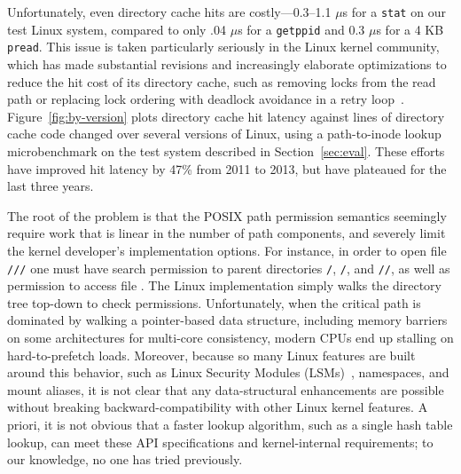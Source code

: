 Unfortunately, even directory cache hits are costly---0.3--1.1 $\mu$s for a {\tt stat} on our test Linux system, compared to only .04 $\mu$s for a {\tt getppid} and 0.3 $\mu$s for a 4 KB {\tt pread}. 
This issue is taken particularly seriously in the Linux kernel community, which has 
made substantial revisions and increasingly elaborate optimizations to reduce the hit cost
of its directory cache, such as removing locks from the read path or replacing lock ordering with deadlock avoidance in a retry loop~\cite{corbet09jls,dcache-rcu}.
Figure~\ref{fig:by-version} plots directory cache hit latency against  lines of directory cache code changed 
over several versions of Linux, using a path-to-inode lookup microbenchmark on the test system described
in Section~\ref{sec:eval}.
These efforts have improved hit latency by 47\% from 2011 to 2013, but have plateaued
for the last three years.

The root of the problem is that the POSIX path permission semantics
seemingly require work that is linear in the number of path components,
and severely limit the kernel developer's implementation options.
For instance, in order to open file {\tt /\fnone{}/\fntwo{}/\fnthree{}} 
one must have search permission
to parent directories {\tt /}, {\tt /\fnone{}}, and {\tt /\fnone{}/\fntwo{}},
as well as permission to access file {\tt \fnthree{}}.
The Linux implementation %
simply walks the directory
tree top-down to check permissions.  
Unfortunately, when the critical path is dominated by 
walking a pointer-based data structure, 
including memory barriers on some architectures for multi-core consistency, 
modern CPUs end up stalling on hard-to-prefetch loads.
Moreover, because so many Linux features are built around this behavior, such as Linux Security Modules (LSMs)~\cite{wright+lsm},
namespaces, and mount aliases, it is not clear that any data-structural enhancements
are possible without breaking backward-compatibility with other Linux kernel features.
A priori, it is not obvious that a faster lookup algorithm, such as a single hash table lookup, 
can meet these API specifications and kernel-internal requirements; to our knowledge,
no one has tried previously.

